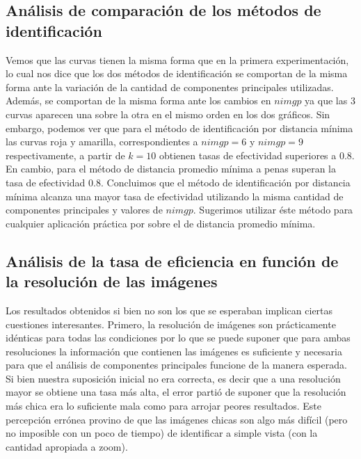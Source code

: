 \subsection{Análisis de comparación de los métodos de identificación}
Vemos que las curvas tienen la misma forma que en la primera experimentación, lo cual nos dice que los dos métodos de identificación
se comportan de la misma forma ante la variación de la cantidad de componentes principales utilizadas. Además, se comportan de la misma
forma ante los cambios en $nimgp$ ya que las 3 curvas aparecen una sobre la otra en el mismo orden en los dos gráficos. Sin embargo, 
podemos ver que para el método de identificación por distancia mínima las curvas roja y amarilla, correspondientes a $nimgp = 6$ y $nimgp = 9$
respectivamente, a partir de $k = 10$ obtienen tasas de efectividad superiores a $0.8$. En cambio, para el método de distancia promedio mínima
a penas superan la tasa de efectividad $0.8$. Concluimos que el método de identificación por distancia mínima alcanza una mayor tasa de 
efectividad utilizando la misma cantidad de componentes principales y valores de $nimgp$. Sugerimos utilizar éste método para cualquier
aplicación práctica por sobre el de distancia promedio mínima.

\subsection{Análisis de la tasa de eficiencia en función de la resolución de las imágenes}
Los resultados obtenidos si bien no son los que se esperaban implican ciertas cuestiones interesantes. Primero, la resolución de imágenes 
son prácticamente idénticas para todas las condiciones por lo que se puede suponer que para ambas resoluciones la información que contienen
las imágenes es suficiente y necesaria para que el análisis de componentes principales funcione de la manera esperada. Si bien nuestra 
suposición inicial no era correcta, es decir que a una resolución mayor se obtiene una tasa más alta, el error partió de suponer que la 
resolución más chica era lo suficiente mala como para arrojar peores resultados. Este percepción errónea provino de que las imágenes chicas 
son algo más difícil (pero no imposible con un poco de tiempo) de identificar a simple vista (con la cantidad apropiada a zoom).